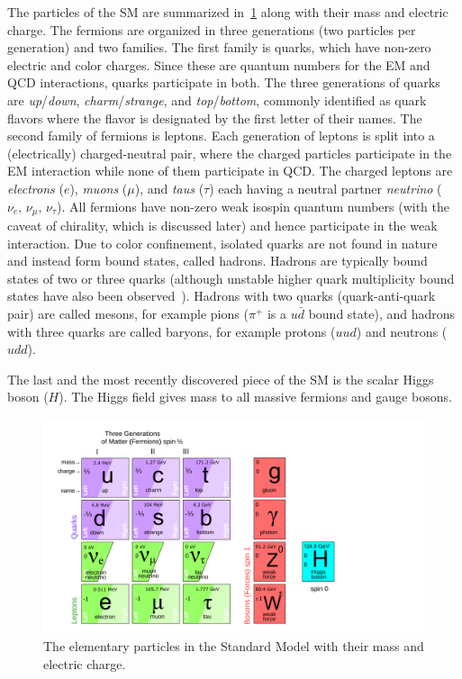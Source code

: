The particles of the SM are summarized in~\cref{fig:sm} along with their mass and electric charge. The fermions are organized in three generations (two particles per generation) and two families. The first family is quarks, which have non-zero electric and color charges. Since these are quantum numbers for the EM and QCD interactions, quarks participate in both. The three generations of quarks are \textit{up}/\textit{down}, \textit{charm}/\textit{strange}, and \textit{top}/\textit{bottom}, commonly identified as quark flavors where the flavor is designated by the first letter of their names. The second family of fermions is leptons. Each generation of leptons is split into a (electrically) charged-neutral pair, where the charged particles participate in the EM interaction while none of them participate in QCD. The charged leptons are \textit{electrons} ($e$), \textit{muons} ($\mu$), and \textit{taus} ($\tau$) each having a neutral partner \textit{neutrino} ($\nu_e,\,\nu_\mu,\,\nu_\tau$). All fermions have non-zero weak isospin quantum numbers (with the caveat of chirality, which is discussed later) and hence participate in the weak interaction. Due to color confinement, isolated quarks are not found in nature and instead form bound states, called hadrons. Hadrons are typically bound states of two or three quarks (although unstable higher quark multiplicity bound states have also been observed~\cite{PhysRevLett.112.222002, PhysRevLett.131.031901}). Hadrons with two quarks (quark-anti-quark pair) are called mesons, for example pions ($\pi^+$ is a $u\bar{d}$ bound state), and hadrons with three quarks are called baryons, for example protons ($uud$) and neutrons ($udd$). 

The last and the most recently discovered piece of the SM is the scalar Higgs boson ($H$). The Higgs field gives mass to all massive fermions and gauge bosons.

\begin{figure}[!th]
    \centering
    \includegraphics[width=.8\linewidth]{figures/theory/SM_no_HNL.pdf}
    \caption{The elementary particles in the Standard Model with their mass and electric charge.~\cite{Gninenko2012}}
    \label{fig:sm}
\end{figure}

